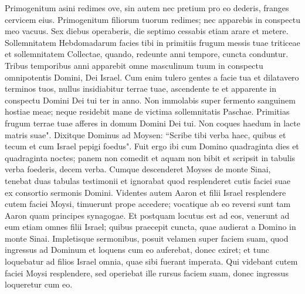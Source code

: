 \begin{biblechapter}
\verse Primogenitum asini redimes ove, sin autem nec pretium pro eo dederis, franges cervicem eius. Primogenitum filiorum tuorum redimes; nec apparebis in conspectu meo vacuus. 
\verse Sex diebus operaberis, die septimo cessabis etiam arare et metere. 
\verse Sollemnitatem Hebdomadarum facies tibi in primitiis frugum messis tuae triticeae et sollemnitatem Collectae, quando, redeunte anni tempore, cuncta conduntur. 
\verse Tribus temporibus anni apparebit omne masculinum tuum in conspectu omnipotentis Domini, Dei Israel. 
\verse Cum enim tulero gentes a facie tua et dilatavero terminos tuos, nullus insidiabitur terrae tuae, ascendente te et apparente in conspectu Domini Dei tui ter in anno. 
\verse Non immolabis super fermento sanguinem hostiae meae; neque residebit mane de victima sollemnitatis Paschae. 
\verse Primitias frugum terrae tuae afferes in domum Domini Dei tui. Non coques haedum in lacte matris suae". 
\verse Dixitque Dominus ad Moysen: “Scribe tibi verba haec, quibus et tecum et cum Israel pepigi foedus". 
\verse Fuit ergo ibi cum Domino quadraginta dies et quadraginta noctes; panem non comedit et aquam non bibit et scripsit in tabulis verba foederis, decem verba. 
\verse Cumque descenderet Moyses de monte Sinai, tenebat duas tabulas testimonii et ignorabat quod resplenderet cutis faciei suae ex consortio sermonis Domini.  
\verse Videntes autem Aaron et filii Israel resplendere cutem faciei Moysi, timuerunt prope accedere; 
\verse vocatique ab eo reversi sunt tam Aaron quam principes synagogae. Et postquam locutus est ad eos, 
\verse venerunt ad eum etiam omnes filii Israel; quibus praecepit cuncta, quae audierat a Domino in monte Sinai. 
\verse Impletisque sermonibus, posuit velamen super faciem suam, 
\verse quod ingressus ad Dominum et loquens cum eo auferebat, donec exiret; et tunc loquebatur ad filios Israel omnia, quae sibi fuerant imperata. 
\verse Qui videbant cutem faciei Moysi resplendere, sed operiebat ille rursus faciem suam, donec ingressus loqueretur cum eo. 
\end{biblechapter}

